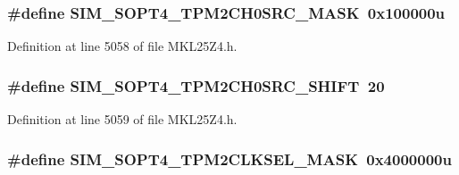 \subsubsection[{\texorpdfstring{S\+I\+M\+\_\+\+S\+O\+P\+T4\+\_\+\+T\+P\+M2\+C\+H0\+S\+R\+C\+\_\+\+M\+A\+SK}{SIM_SOPT4_TPM2CH0SRC_MASK}}]{\setlength{\rightskip}{0pt plus 5cm}\#define S\+I\+M\+\_\+\+S\+O\+P\+T4\+\_\+\+T\+P\+M2\+C\+H0\+S\+R\+C\+\_\+\+M\+A\+SK~0x100000u}\hypertarget{group___s_i_m___register___masks_ga871c6061ab30b4ad99b919e35e86c081}{}\label{group___s_i_m___register___masks_ga871c6061ab30b4ad99b919e35e86c081}


Definition at line 5058 of file M\+K\+L25\+Z4.\+h.

\subsubsection[{\texorpdfstring{S\+I\+M\+\_\+\+S\+O\+P\+T4\+\_\+\+T\+P\+M2\+C\+H0\+S\+R\+C\+\_\+\+S\+H\+I\+FT}{SIM_SOPT4_TPM2CH0SRC_SHIFT}}]{\setlength{\rightskip}{0pt plus 5cm}\#define S\+I\+M\+\_\+\+S\+O\+P\+T4\+\_\+\+T\+P\+M2\+C\+H0\+S\+R\+C\+\_\+\+S\+H\+I\+FT~20}\hypertarget{group___s_i_m___register___masks_ga85ccc239517b7633b2c0a164b8d5cbf3}{}\label{group___s_i_m___register___masks_ga85ccc239517b7633b2c0a164b8d5cbf3}


Definition at line 5059 of file M\+K\+L25\+Z4.\+h.

\subsubsection[{\texorpdfstring{S\+I\+M\+\_\+\+S\+O\+P\+T4\+\_\+\+T\+P\+M2\+C\+L\+K\+S\+E\+L\+\_\+\+M\+A\+SK}{SIM_SOPT4_TPM2CLKSEL_MASK}}]{\setlength{\rightskip}{0pt plus 5cm}\#define S\+I\+M\+\_\+\+S\+O\+P\+T4\+\_\+\+T\+P\+M2\+C\+L\+K\+S\+E\+L\+\_\+\+M\+A\+SK~0x4000000u}\hypertarget{group___s_i_m___register___masks_gad5a902a0614ee968bf5f4e8b4d619631}{}\label{group___s_i_m___register___masks_gad5a902a0614ee968bf5f4e8b4d619631}


